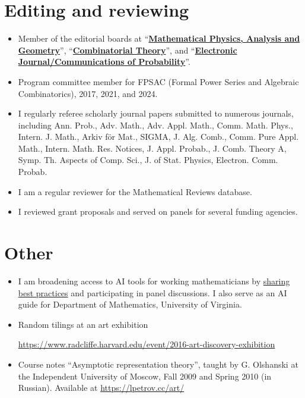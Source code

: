\documentclass[letterpaper,11pt]{article}
\begin{document}
\section*{Editing and reviewing}

\begin{itemize}
	\item
	Member of the editorial boards at ``\href{https://www.springer.com/journal/11040}{\textbf{Mathematical Physics, Analysis and Geometry}}'', ``\href{https://escholarship.org/uc/combinatorial_theory/}{\textbf{Combinatorial Theory}}'', and ``\href{https://imstat.org/journals-and-publications/electronic-journal-of-probability/}{\textbf{Electronic Journal/Communications of Probability}}''.
	\item Program committee member for FPSAC (Formal Power Series and Algebraic Combinatorics),
		2017, 2021, and 2024.
	\item
	I regularly referee scholarly journal papers submitted to numerous journals,
	including
	Ann. Prob., Adv. Math., Adv. Appl. Math., Comm. Math. Phys., Intern. J. Math.,
	Arkiv f\"or Mat., SIGMA, J. Alg. Comb., Comm. Pure Appl. Math., Intern. Math.
	Res. Notices, J. Appl. Probab., J. Comb. Theory A, Symp. Th. Aspects of Comp.
	Sci., J. of Stat. Physics, Electron. Comm. Probab.
	\item
	I am a regular
	reviewer for the Mathematical Reviews database.
	\item
	I reviewed grant proposals and served on panels for several funding agencies.
\end{itemize}

\section*{Other}

\begin{itemize}
	\item
	I am broadening access to AI tools for working mathematicians by \href{https://lpetrov.cc/AI-math/}{sharing} \href{https://storage.lpetrov.cc/research_files/talks/AI_UVA_Oct10.pdf}{best practices} and participating in panel discussions. I also serve as an AI guide for Department of Mathematics, University of Virginia.



	\item
	Random tilings at an art exhibition

	\url{https://www.radcliffe.harvard.edu/event/2016-art-discovery-exhibition}
	\item
	Course notes
	``Asymptotic representation theory'',
	taught by G. Olshanski
	at the Independent University of Moscow,
	Fall 2009 and Spring 2010 (in Russian).
	Available at \url{https://lpetrov.cc/art/}

\end{itemize}
\end{document}
